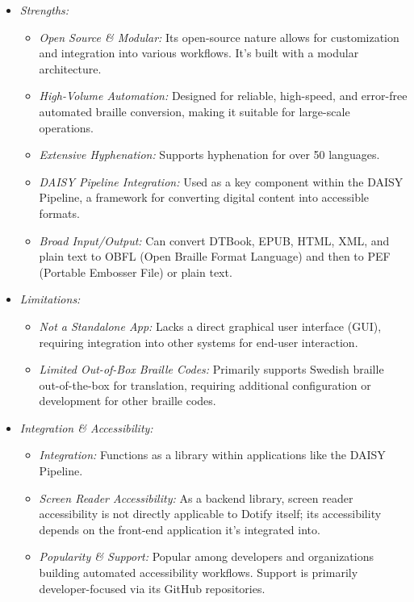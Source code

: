 \begin{itemize}
    \item \emph{Strengths:}
    \begin{itemize}
        \item \emph{Open Source \& Modular:} Its open-source nature allows for customization and integration into various workflows. It's built with a modular architecture.
        \item \emph{High-Volume Automation:} Designed for reliable, high-speed, and error-free automated braille conversion, making it suitable for large-scale operations.
        \item \emph{Extensive Hyphenation:} Supports hyphenation for over 50 languages.
        \item \emph{DAISY Pipeline Integration:} Used as a key component within the DAISY Pipeline, a framework for converting digital content into accessible formats.
        \item \emph{Broad Input/Output:} Can convert DTBook, EPUB, HTML, XML, and plain text to OBFL (Open Braille Format Language) and then to PEF (Portable Embosser File) or plain text.
    \end{itemize}
    \item \emph{Limitations:}
    \begin{itemize}
        \item \emph{Not a Standalone App:} Lacks a direct graphical user interface (GUI), requiring integration into other systems for end-user interaction.
        \item \emph{Limited Out-of-Box Braille Codes:} Primarily supports Swedish braille out-of-the-box for translation, requiring additional configuration or development for other braille codes.
    \end{itemize}
    \item \emph{Integration \& Accessibility:}
    \begin{itemize}
        \item \emph{Integration:} Functions as a library within applications like the DAISY Pipeline.
        \item \emph{Screen Reader Accessibility:} As a backend library, screen reader accessibility is not directly applicable to Dotify itself; its accessibility depends on the front-end application it's integrated into.
        \item \emph{Popularity \& Support:} Popular among developers and organizations building automated accessibility workflows. Support is primarily developer-focused via its GitHub repositories.
    \end{itemize}
\end{itemize}

